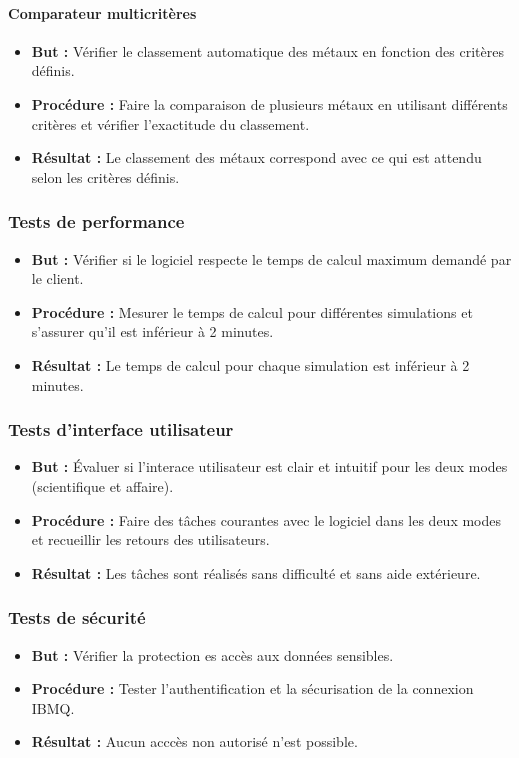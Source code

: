 \documentclass[11pt]{article}
\begin{document}
\paragraph{Comparateur multicritères}
\begin{itemize}
  \item \textbf{But :} Vérifier le classement automatique des métaux en fonction des critères définis.
  \item \textbf{Procédure :} Faire la comparaison de plusieurs métaux en utilisant différents critères et vérifier l'exactitude du classement.
  \item \textbf{Résultat :} Le classement des métaux correspond avec ce qui est attendu selon les critères définis.
\end{itemize}
\subsubsection{Tests de performance}
\begin{itemize}
  \item \textbf{But :} Vérifier si le logiciel respecte le temps de calcul maximum demandé par le client.
  \item \textbf{Procédure :} Mesurer le temps de calcul pour différentes simulations et s'assurer qu'il est inférieur à 2 minutes.
  \item \textbf{Résultat :} Le temps de calcul pour chaque simulation est inférieur à 2 minutes.
\end{itemize}
\subsubsection{Tests d'interface utilisateur}
\begin{itemize}
  \item \textbf{But :} Évaluer si l'interace utilisateur est clair et intuitif pour les deux modes (scientifique et affaire).
  \item \textbf{Procédure :} Faire des tâches courantes avec le logiciel dans les deux modes et recueillir les retours des utilisateurs.
  \item \textbf{Résultat :} Les tâches sont réalisés sans difficulté et sans aide extérieure.
\end{itemize}
\subsubsection{Tests de sécurité}
\begin{itemize}
  \item \textbf{But :} Vérifier la protection es accès aux données sensibles.
  \item \textbf{Procédure :} Tester l'authentification et la sécurisation de la connexion IBMQ.
  \item \textbf{Résultat :} Aucun acccès non autorisé n'est possible.
\end{itemize}
\end{document}
